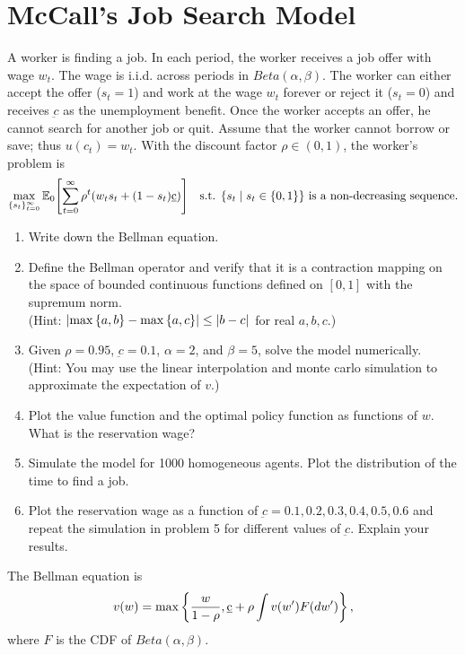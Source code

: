 \documentclass[12pt]{article}
\begin{document}
\section{McCall's Job Search Model}
A worker is finding a job. In each period, the worker receives 
a job offer with wage $w_t$. The wage is i.i.d. across periods 
in $Beta(\alpha,\beta)$. The worker can either 
accept the offer ($s_t=1$) and work at the wage $w_t$ forever 
or reject it ($s_t=0$) and receives $\underbar{c}$ as the 
unemployment benefit. Once the worker accepts an offer, he 
cannot search for another job or quit. Assume that the worker 
cannot borrow or save; thus $u(c_t)=w_t$. 
With the discount factor $\rho\in(0,1)$, the worker's problem 
is 
\begin{equation*}
    \max_{\{s_t\}_{t=0}^\infty} \E_0\sbrc{\sum_{t=0}^\infty \rho^t(w_ts_t+(1-s_t)\underbar{c})}\quad \text{s.t. $\Set{s_t}{s_t\in\set{0,1}}$ is a non-decreasing sequence}.
\end{equation*}
\begin{enumerate}
    \item Write down the Bellman equation.
    \item Define the Bellman operator and verify that it is a 
    contraction mapping on the space of bounded continuous functions 
    defined on $[0,1]$ with the supremum norm.\\
    (Hint: $\left\lvert {\max\left\{ {a,b} \right\}-\max\left\{ {a,c} \right\}} \right\rvert\leq\left\lvert {b-c} \right\rvert$ for real $a,b,c$.)
    \item Given $\rho = 0.95$, $\underbar{c} = 0.1$, $\alpha = 2$, 
    and $\beta = 5$, solve the model numerically.\\
    (Hint: You may use the linear interpolation and monte carlo simulation to 
    approximate the expectation of $v$.)
    \item Plot the value function and the optimal policy function as functions 
    of $w$. What is the reservation wage? 
    \item Simulate the model for 1000 homogeneous agents. Plot the distribution 
    of the time to find a job. 
    \item Plot the reservation wage as a function of $\underbar{c} = 0.1, 0.2, 0.3,
    0.4, 0.5, 0.6$ and repeat the simulation in problem 5 for different values of 
    $\underbar{c}$. Explain your results.
\end{enumerate}

\begin{sol}[4.1]
    The Bellman equation is
    \vspace{-1em}
    \begin{equation*}
        v(w) = \max \left\{ {\frac{w}{1-\rho}, \underbar{c} + \rho \int v(w') F(dw')} \right\},
    \end{equation*}
    where $F$ is the CDF of $Beta(\alpha,\beta)$.
    \solend
\end{sol}
\end{document}
